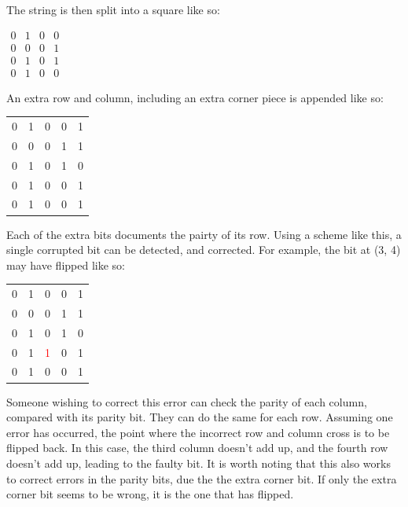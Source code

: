 \documentclass{article}
\begin{document}

    The string is then split into a square like so:

    \begin{center}
    \begin{math}
    \begin{matrix}
        0 & 1 & 0 & 0 \\ 
        0 & 0 & 0 & 1 \\
        0 & 1 & 0 & 1 \\
        0 & 1 & 0 & 0
    \end{matrix}
    \end{math}
    \end{center}

    An extra row and column, including an extra corner piece is appended like
    so:

    \begin{center}
    \begin{tabular}{c c c c | c}
        0 & 1 & 0 & 0 & 1 \\ 
        0 & 0 & 0 & 1 & 1 \\
        0 & 1 & 0 & 1 & 0 \\
        0 & 1 & 0 & 0 & 1 \\ \hline
        0 & 1 & 0 & 0 & 1
   \end{tabular}
   \end{center}

   Each of the extra bits documents the pairty of its row. Using a scheme like
   this, a single corrupted bit can be detected, and corrected. For example,
   the bit at (3, 4) may have flipped like so:

    \begin{center}
    \begin{tabular}{c c c c | c}
        0 & 1 & 0 & 0 & 1 \\
        0 & 0 & 0 & 1 & 1 \\
        0 & 1 & 0 & 1 & 0 \\
        0 & 1 & \textcolor{red}{1} & 0 & 1 \\ \hline
        0 & 1 & 0 & 0 & 1
   \end{tabular}
   \end{center}

    Someone wishing to correct this error can check the parity of each column,
    compared with its parity bit. They can do the same for each row. Assuming
    one error has occurred, the point where the incorrect row and column cross
    is to be flipped back. In this case, the third column doesn't add up, and
    the fourth row doesn't add up, leading to the faulty bit. It is worth
    noting that this also works to correct errors in the parity bits, due the
    the extra corner bit. If only the extra corner bit seems to be wrong, it is
    the one that has flipped.
\end{document}
